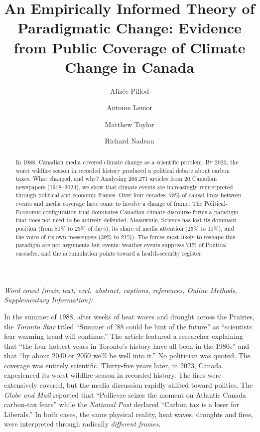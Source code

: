 \documentclass[11pt]{article}
\title{\textbf{An Empirically Informed Theory of Paradigmatic Change: Evidence from Public Coverage of Climate Change in Canada}}
\author[1]{Aliz\'{e}e Pillod}
\author[2]{Antoine Lemor}
\author[1]{Matthew Taylor}
\author[1]{Richard Nadeau}
\affil[1]{Universit\'{e} de Montr\'{e}al}
\affil[2]{Universit\'{e} de Sherbrooke}
\date{}
\begin{document}
\maketitle

\begin{abstract}
In 1988, Canadian media covered climate change as a scientific problem. By 2023, the worst wildfire season in recorded history produced a political debate about carbon taxes. What changed, and why? Analysing 266,271 articles from 20 Canadian newspapers (1978--2024), we show that climate events are increasingly reinterpreted through political and economic frames. Over four decades, 78\% of causal links between events and media coverage have come to involve a change of frame. The Political-Economic configuration that dominates Canadian climate discourse forms a paradigm that does not need to be actively defended. Meanwhile, Science has lost its dominant position (from 81\% to 23\% of days), its share of media attention (25\% to 11\%), and the voice of its own messengers (39\% to 21\%). The forces most likely to reshape this paradigm are not arguments but events: weather events suppress 71\% of Political cascades, and the accumulation points toward a health-security register.
\end{abstract}

\vspace{6pt}
\noindent\footnotesize\textit{Word count (main text, excl.\ abstract, captions, references, Online Methods, Supplementary Information):}
\immediate{}

\normalsize
\vspace{12pt}


In the summer of 1988, after weeks of heat waves and drought across the Prairies, the \textit{Toronto Star} titled ``Summer of '88 could be hint of the future'' as ``scientists fear warming trend will continue.'' The article featured a researcher explaining that ``the four hottest years in Toronto's history have all been in the 1980s'' and that ``by about 2040 or 2050 we'll be well into it.'' No politician was quoted. The coverage was entirely scientific. Thirty-five years later, in 2023, Canada experienced its worst wildfire season in recorded history. The fires were extensively covered, but the media discussion rapidly shifted toward politics. The \textit{Globe and Mail} reported that ``Poilievre seizes the moment on Atlantic Canada carbon-tax fears'' while the \textit{National Post} declared ``Carbon tax is a loser for Liberals.'' In both cases, the same physical reality, heat waves, droughts and fires, were interpreted through radically \emph{different frames}. 
\end{document}
